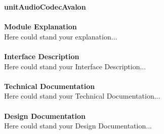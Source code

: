 \documentclass[../../../../doc/ASP-SoC_doc/main.tex]{subfiles}
\begin{document}
\textbf{unitAudioCodecAvalon}
\\\\
\textbf{Module Explanation}
\\
Here could stand your explanation...\\
\\
\textbf{Interface Description}
\\
Here could stand your Interface Description...\\
\\
\textbf{Technical Documentation}
\\
Here could stand your Technical Documentation...\\
\\
\textbf{Design Documentation}
\\
Here could stand your Design Documentation...\\
\\
\end{document}
